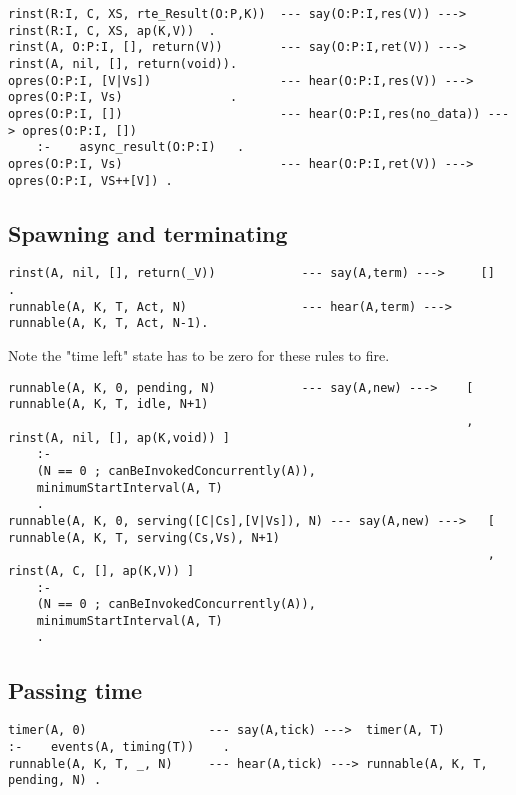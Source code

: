 \begin{verbatim}
rinst(R:I, C, XS, rte_Result(O:P,K))  --- say(O:P:I,res(V)) --->        rinst(R:I, C, XS, ap(K,V))  .
rinst(A, O:P:I, [], return(V))        --- say(O:P:I,ret(V)) --->        rinst(A, nil, [], return(void)).
opres(O:P:I, [V|Vs])                  --- hear(O:P:I,res(V)) --->       opres(O:P:I, Vs)               .
opres(O:P:I, [])                      --- hear(O:P:I,res(no_data)) ---> opres(O:P:I, [])
    :-    async_result(O:P:I)   .
opres(O:P:I, Vs)                      --- hear(O:P:I,ret(V)) --->       opres(O:P:I, VS++[V]) .
\end{verbatim}

\subsection{Spawning and terminating}

\begin{verbatim}
rinst(A, nil, [], return(_V))            --- say(A,term) --->     []    .
runnable(A, K, T, Act, N)                --- hear(A,term) --->    runnable(A, K, T, Act, N-1).
\end{verbatim}
Note the "time left" state has to be zero for these rules to fire.

\begin{verbatim}
runnable(A, K, 0, pending, N)            --- say(A,new) --->    [ runnable(A, K, T, idle, N+1)
                                                                , rinst(A, nil, [], ap(K,void)) ]
    :-
    (N == 0 ; canBeInvokedConcurrently(A)),
    minimumStartInterval(A, T)
    .
runnable(A, K, 0, serving([C|Cs],[V|Vs]), N) --- say(A,new) --->   [ runnable(A, K, T, serving(Cs,Vs), N+1)
                                                                   , rinst(A, C, [], ap(K,V)) ]
    :-
    (N == 0 ; canBeInvokedConcurrently(A)),
    minimumStartInterval(A, T)
    .
\end{verbatim}
\subsection{Passing time}

\begin{verbatim}
timer(A, 0)                 --- say(A,tick) --->  timer(A, T)                :-    events(A, timing(T))    .
runnable(A, K, T, _, N)     --- hear(A,tick) ---> runnable(A, K, T, pending, N) .
\end{verbatim}

